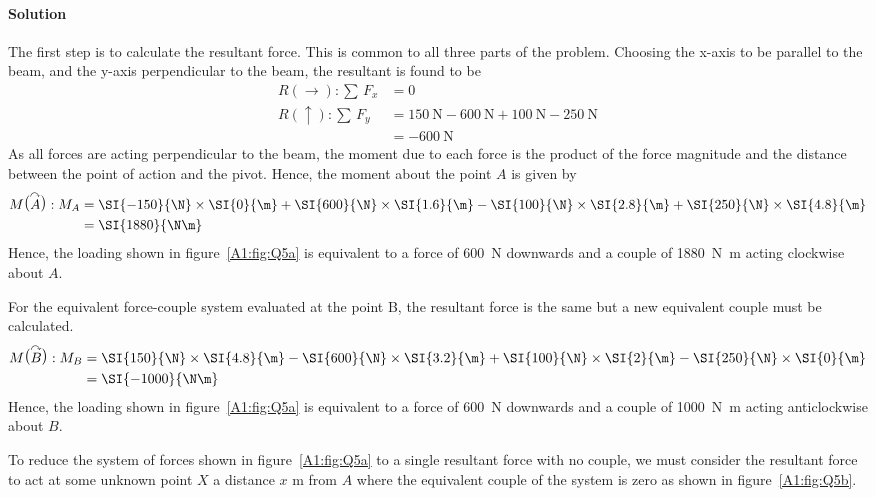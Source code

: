 \documentclass[a4paper,justified,oneside]{tufte-handout}
\numberwithin{equation}{subsection}
\begin{document}
\begin{solution}
\paragraph{Solution}
The first step is to calculate the resultant force. This is common to all three parts of the problem. Choosing the x-axis to be parallel to the beam, and the y-axis perpendicular to the beam, the resultant is found to be
\begin{align*}
	R\left(\rightarrow\right):	\sum\, F_x	&= 0	\\
	R\left(\uparrow\right):	\sum\, F_y		&= \SI{150}{\N} - \SI{600}{\N} + \SI{100}{\N} - \SI{250}{\N}	\\	
											&=	\SI{-600}{\N}
\end{align*}
As all forces are acting perpendicular to the beam, the moment due to each force is the product of the force magnitude and the distance between the point of action and the pivot. Hence, the moment about the point $A$ is given by
\begin{align*}
	M\raisebox{1.5pt}{\big(}\overset{\curvearrowright}{A}\raisebox{1.5pt}{\big)}: M_A 	&=	\SI{-150}{\N}\times \SI{0}{\m} + \SI{600}{\N}\times \SI{1.6}{\m} - \SI{100}{\N}\times \SI{2.8}{\m} + \SI{250}{\N} \times \SI{4.8}{\m}	\\
																						&=	\SI{1880}{\N\m}
\end{align*}
Hence, the loading shown in figure~\ref{A1:fig:Q5a} is equivalent to a force of \SI{600}{\N} downwards and a couple of \SI{1880}{\N\m} acting clockwise about $A$.

For the equivalent force-couple system evaluated at the point B, the resultant force is the same but a new equivalent couple must be calculated.
\begin{align*}
	M\raisebox{1.5pt}{\big(}\overset{\curvearrowright}{B}\raisebox{1.5pt}{\big)}: M_B 	&=	\SI{150}{\N}\times \SI{4.8}{\m} - \SI{600}{\N}\times \SI{3.2}{\m} + \SI{100}{\N}\times \SI{2}{\m} - \SI{250}{\N} \times \SI{0}{\m}	\\
	&=	\SI{-1000}{\N\m}
\end{align*}
Hence, the loading shown in figure~\ref{A1:fig:Q5a} is equivalent to a force of \SI{600}{\N} downwards and a couple of \SI{1000}{\N\m} acting anticlockwise about $B$.

To reduce the system of forces shown in figure~\ref{A1:fig:Q5a} to a single resultant force with no couple, we must consider the resultant force to act at some unknown point $X$ a distance $x$ \si{\m} from $A$ where the equivalent couple of the system is zero as shown in figure~\ref{A1:fig:Q5b}.


\end{solution}
\end{document}
